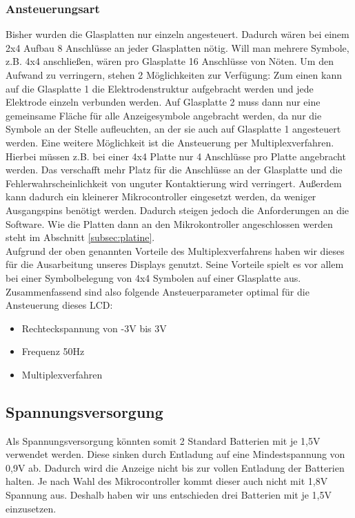 \subsubsection{Ansteuerungsart}
Bisher wurden die Glasplatten nur einzeln angesteuert. Dadurch wären bei einem 2x4 Aufbau 8 Anschlüsse an jeder Glasplatten nötig. Will man mehrere Symbole, z.B. 4x4 anschließen, wären pro Glasplatte 16 Anschlüsse von Nöten. Um den Aufwand zu verringern, stehen 2 Möglichkeiten zur Verfügung: Zum einen kann auf die Glasplatte 1 die Elektrodenstruktur aufgebracht werden und jede Elektrode einzeln verbunden werden. Auf Glasplatte 2 muss dann nur eine gemeinsame Fläche für alle Anzeigesymbole angebracht werden, da nur die Symbole an der Stelle aufleuchten, an der sie auch auf Glasplatte 1 angesteuert werden. Eine weitere Möglichkeit ist die Ansteuerung per Multiplexverfahren. Hierbei müssen z.B. bei einer 4x4 Platte nur 4 Anschlüsse pro Platte angebracht werden. Das verschafft mehr Platz für die Anschlüsse an der Glasplatte und die Fehlerwahrscheinlichkeit von unguter Kontaktierung wird verringert. Außerdem kann dadurch ein kleinerer Mikrocontroller eingesetzt werden, da weniger Ausgangspins benötigt werden. Dadurch steigen jedoch die Anforderungen an die Software. Wie die Platten dann an den Mikrokontroller angeschlossen werden steht im Abschnitt \ref{subsec:platine}.\\

Aufgrund der oben genannten Vorteile des Multiplexverfahrens haben wir dieses für die Ausarbeitung unseres Displays genutzt. Seine Vorteile spielt es vor allem bei einer Symbolbelegung von 4x4 Symbolen auf einer Glasplatte aus.\\

Zusammenfassend sind also folgende Ansteuerparameter optimal für die Ansteuerung dieses LCD:
\begin{itemize}
\item Rechteckspannung von -3V bis 3V
\item Frequenz 50Hz
\item Multiplexverfahren
\end{itemize}

\subsection{Spannungsversorgung}
Als Spannungsversorgung könnten somit 2 Standard Batterien mit je 1,5V verwendet werden. Diese sinken durch Entladung auf eine Mindestspannung von 0,9V ab. Dadurch wird die Anzeige nicht bis zur vollen Entladung der Batterien halten. Je nach Wahl des Mikrocontroller kommt dieser auch nicht mit 1,8V Spannung aus. Deshalb haben wir uns entschieden drei Batterien mit je 1,5V einzusetzen.

